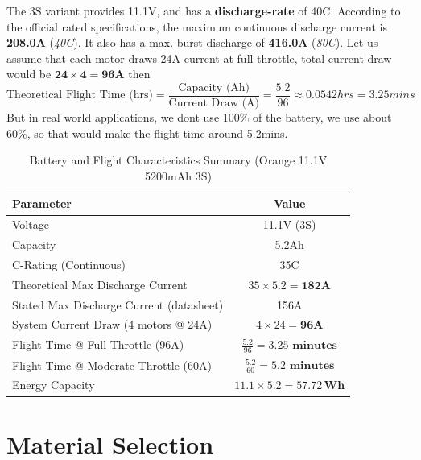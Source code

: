 \documentclass[12pt]{report}
\begin{document}
      The 3S variant provides 11.1V, and has a \textbf{discharge-rate} of 40C. According to the official rated specifications, the maximum continuous discharge current is \textbf{208.0A} (\textit{40C}). It also has a max. burst discharge of \textbf{416.0A} (\textit{80C}). Let us assume that each motor draws 24A current at full-throttle, total current draw would be $ \boldsymbol{24 \times 4 = 96A} $ then \vspace{0.5cm} \[ \text{Theoretical Flight Time (hrs)} = \frac{\text{Capacity (Ah)}}{\text{Current Draw (A)}} = \frac{5.2}{96} \approx 0.0542 hrs = 3.25 mins \] But in real world applications, we dont use 100\% of the battery, we use about 60\%, so that would make the flight time around 5.2mins. 
      \begin{table}[h!]
      \centering
      \caption{Battery and Flight Characteristics Summary (Orange 11.1V 5200mAh 3S)}
        \begin{tabular}{|l|c|}
          \hline
          \textbf{Parameter} & \textbf{Value} \\
          \hline
          Voltage & 11.1V (3S) \\
          \hline
          Capacity & 5.2Ah \\
          \hline
          C-Rating (Continuous) & 35C \\
          \hline
          Theoretical Max Discharge Current & $35 \times 5.2 = \mathbf{182A}$ \\
          \hline
          Stated Max Discharge Current (datasheet) & 156A \\
          \hline
          System Current Draw (4 motors @ 24A) & $4 \times 24 = \mathbf{96A}$ \\
          \hline
          Flight Time @ Full Throttle (96A) & $\frac{5.2}{96} = \mathbf{3.25 \text{ minutes}}$ \\
          \hline
          Flight Time @ Moderate Throttle (60A) & $\frac{5.2}{60} = \mathbf{5.2 \text{ minutes}}$ \\
          \hline
          Energy Capacity & $11.1 \times 5.2 = \mathbf{57.72\,Wh}$ \\
          \hline
        \end{tabular}
      \end{table}


    \section{Material Selection}
\end{document}
